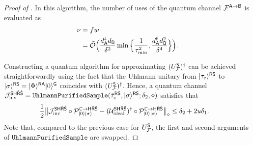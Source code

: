 \begin{proof}[Proof of ]
In this algorithm, the number of uses of the quantum channel ${\mathcal{F}}^{{\mathsf{A}}\rightarrow{\mathsf{B}}}$ is evaluated as
\begin{align}
    \nu 
    &= fw \\
    \label{inteq:19}
    &= \tilde{{\mathcal{O}}}\Big(\frac{d_{\mathsf{A}}^4 d_{\mathsf{B}}}{\delta^2}\min\Big\{\frac{1}{\tau_{\rm min}^2}, \frac{d_{\mathsf{A}}^6d_{\mathsf{B}}^2}{\delta^4}\Big\}\Big).
\end{align}


Constructing a quantum algorithm for approximating $(U_{\mathcal{F}}^{\mathsf{S}})^\dag$ can be achieved straightforwardly using the fact that the Uhlmann unitary from $|\tau_{\rm c}\rangle^{{\mathsf{R}}{\mathsf{S}}}$ to $|\sigma\rangle^{{\mathsf{R}}{\mathsf{S}}} = |\Phi\rangle^{{\mathsf{R}}{\mathsf{A}}}|0\rangle^{\mathsf{G}}$ coincides with $(U_{\mathcal{F}}^{\mathsf{S}})^\dag$.
Hence, a quantum channel ${\mathcal{J}}_{\rm inv}^{{\mathsf{S}}{\mathsf{H}}\hat{{\mathsf{R}}}\hat{{\mathsf{S}}}} = \mathtt{UhlmannPurifiedSample}(\tilde{\tau}_{\rm c}^{{\mathsf{R}}{\mathsf{S}}}, |\sigma\rangle^{{\mathsf{R}}{\mathsf{S}}}; \delta_2, \diamond)$ satisfies that
\begin{align}
\label{inteq:123}
    &\frac{1}{2}\big\|{\mathcal{J}}_{\rm inv}^{{\mathsf{S}}{\mathsf{H}}\hat{{\mathsf{R}}}\hat{{\mathsf{S}}}}\circ{\mathcal{P}}_{|0\rangle|\sigma\rangle}^{\mathbb{C}\rightarrow{\mathsf{H}}\hat{{\mathsf{R}}}\hat{{\mathsf{S}}}} - ({\mathcal{U}}_{\rm ideal}^{{\mathsf{S}}{\mathsf{H}}\hat{{\mathsf{R}}}\hat{{\mathsf{S}}}})^\dag \circ {\mathcal{P}}_{|0\rangle|\sigma\rangle}^{\mathbb{C}\rightarrow{\mathsf{H}}\hat{{\mathsf{R}}}\hat{{\mathsf{S}}}}\big\|_\diamond 
    \leq \delta_2 + 2u\delta_1.
\end{align}
Note that, compared to the previous case for $U_{\mathcal{F}}^{\mathsf{S}}$, the first and second arguments of $\mathtt{UhlmannPurifiedSample}$ are swapped.



\end{proof}

